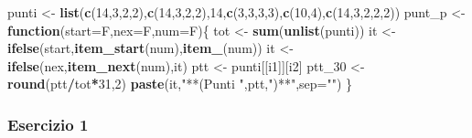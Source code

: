 \documentclass[
  11pt,
]{book}
\newenvironment{Shaded}{\begin{snugshade}}{\end{snugshade}}
\newcommand{\AttributeTok}[1]{\textcolor[rgb]{0.13,0.29,0.53}{#1}}
\newcommand{\ControlFlowTok}[1]{\textcolor[rgb]{0.13,0.29,0.53}{\textbf{#1}}}
\newcommand{\DecValTok}[1]{\textcolor[rgb]{0.00,0.00,0.81}{#1}}
\newcommand{\FunctionTok}[1]{\textcolor[rgb]{0.13,0.29,0.53}{\textbf{#1}}}
\newcommand{\NormalTok}[1]{#1}
\newcommand{\OtherTok}[1]{\textcolor[rgb]{0.56,0.35,0.01}{#1}}
\newcommand{\SpecialCharTok}[1]{\textcolor[rgb]{0.81,0.36,0.00}{\textbf{#1}}}
\newcommand{\StringTok}[1]{\textcolor[rgb]{0.31,0.60,0.02}{#1}}
\theoremstyle{mytheoremstyle}
\theoremstyle{mydefstyle}
\begin{document}
\begin{Shaded}
\begin{Highlighting}[]
\NormalTok{punti }\OtherTok{\textless{}{-}} \FunctionTok{list}\NormalTok{(}\FunctionTok{c}\NormalTok{(}\DecValTok{14}\NormalTok{,}\DecValTok{3}\NormalTok{,}\DecValTok{2}\NormalTok{,}\DecValTok{2}\NormalTok{),}\FunctionTok{c}\NormalTok{(}\DecValTok{14}\NormalTok{,}\DecValTok{3}\NormalTok{,}\DecValTok{2}\NormalTok{,}\DecValTok{2}\NormalTok{),}\DecValTok{14}\NormalTok{,}\FunctionTok{c}\NormalTok{(}\DecValTok{3}\NormalTok{,}\DecValTok{3}\NormalTok{,}\DecValTok{3}\NormalTok{,}\DecValTok{3}\NormalTok{),}\FunctionTok{c}\NormalTok{(}\DecValTok{10}\NormalTok{,}\DecValTok{4}\NormalTok{),}\FunctionTok{c}\NormalTok{(}\DecValTok{14}\NormalTok{,}\DecValTok{3}\NormalTok{,}\DecValTok{2}\NormalTok{,}\DecValTok{2}\NormalTok{,}\DecValTok{2}\NormalTok{))}
\NormalTok{punt\_p }\OtherTok{\textless{}{-}} \ControlFlowTok{function}\NormalTok{(}\AttributeTok{start=}\NormalTok{F,}\AttributeTok{nex=}\NormalTok{F,}\AttributeTok{num=}\NormalTok{F)\{}
\NormalTok{  tot }\OtherTok{\textless{}{-}} \FunctionTok{sum}\NormalTok{(}\FunctionTok{unlist}\NormalTok{(punti))}
\NormalTok{  it }\OtherTok{\textless{}{-}} \FunctionTok{ifelse}\NormalTok{(start,}\FunctionTok{item\_start}\NormalTok{(num),}\FunctionTok{item\_}\NormalTok{(num))}
\NormalTok{  it }\OtherTok{\textless{}{-}} \FunctionTok{ifelse}\NormalTok{(nex,}\FunctionTok{item\_next}\NormalTok{(num),it)}
\NormalTok{  ptt }\OtherTok{\textless{}{-}}\NormalTok{ punti[[i1]][i2]}
\NormalTok{  ptt\_30 }\OtherTok{\textless{}{-}} \FunctionTok{round}\NormalTok{(ptt}\SpecialCharTok{/}\NormalTok{tot}\SpecialCharTok{*}\DecValTok{31}\NormalTok{,}\DecValTok{2}\NormalTok{)}
  \FunctionTok{paste}\NormalTok{(it,}\StringTok{"**(Punti "}\NormalTok{,ptt,}\StringTok{")**"}\NormalTok{,}\AttributeTok{sep=}\StringTok{""}\NormalTok{)}
\NormalTok{\}}
\end{Highlighting}
\end{Shaded}

\subsubsection{Esercizio 1}\label{esercizio-1}
\end{document}

